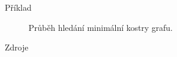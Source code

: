 \documentclass[hyperref={unicode}]{beamer}
\begin{document}
\begin{frame}{Příklad}
\begin{figure}[H]
{    }
    \caption{Průběh hledání minimální kostry grafu.\cite{pict}}
\end{figure}
\end{frame}
\begin{frame}{Zdroje}
\printbibliography
\end{frame}
\end{document}
